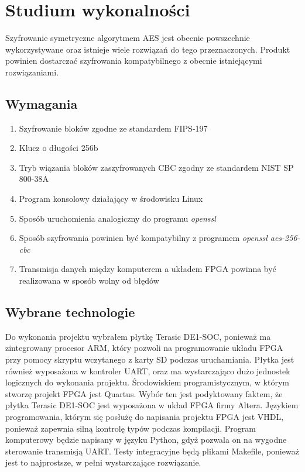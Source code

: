 \section{Studium wykonalności}
\label{sec:studium-wykonalnosci}

Szyfrowanie symetryczne algorytmem AES jest obecnie powszechnie wykorzystywane oraz istnieje wiele rozwiązań do tego przeznaczonych. Produkt powinien dostarczać szyfrowania kompatybilnego z obecnie istniejącymi rozwiązaniami.

\subsection{Wymagania}
\begin{enumerate}
\item Szyfrowanie bloków zgodne ze standardem FIPS-197
\item Klucz o długości 256b
\item Tryb wiązania bloków zaszyfrowanych CBC zgodny ze standardem NIST SP 800-38A
\item Program konsolowy działający w środowisku Linux 
\item Sposób uruchomienia analogiczny do programu \textit{openssl}
\item Sposób szyfrowania powinien być kompatybilny z programem \textit{openssl aes-256-cbc} 
\item Transmisja danych między komputerem a układem FPGA powinna być realizowana w sposób wolny od błędów
\end{enumerate}

\subsection{Wybrane technologie}
Do wykonania projektu wybrałem płytkę Terasic DE1-SOC, ponieważ ma zintegrowany procesor ARM, który pozwoli na programowanie układu FPGA przy pomocy skryptu wczytanego z karty SD podczas uruchamiania. Płytka jest również wyposażona w kontroler UART, oraz ma wystarczająco dużo jednostek logicznych do wykonania projektu.
\break
Środowiskiem programistycznym, w którym stworzę projekt FPGA jest Quartus. Wybór ten jest podyktowany faktem, że płytka Terasic DE1-SOC jest wyposażona w układ FPGA firmy Altera. Językiem programowania, którym się posłużę do napisania projektu FPGA jest VHDL, ponieważ zapewnia silną kontrolę typów podczas kompilacji. Program komputerowy będzie napisany w języku Python, gdyż pozwala on na wygodne sterowanie transmisją UART. Testy integracyjne będą plikami Makefile, ponieważ jest to najprostsze, w pełni wystarczające rozwiązanie.

